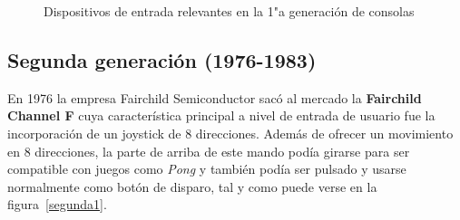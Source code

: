 \begin{figure}[t]
     \hfill
     \caption{Dispositivos de entrada relevantes en la 1"a  generaci\'on de consolas}
     \label{fig:primera}
   \end{figure}

\subsection{Segunda generaci\'on (1976-1983)}


En 1976 la empresa Fairchild Semiconductor sac\'o al mercado la \textbf{Fairchild Channel F} cuya caracter\'istica principal a nivel de entrada de usuario fue la incorporaci\'on de un joystick de 8 direcciones.  Adem\'as de ofrecer un movimiento en 8 direcciones, la parte de arriba de este mando pod\'ia girarse para ser compatible con juegos como \textit{Pong} y tambi\'en pod\'ia ser pulsado y usarse normalmente como bot\'on de disparo, tal y como puede verse en la figura~\ref{segunda1}. \\

